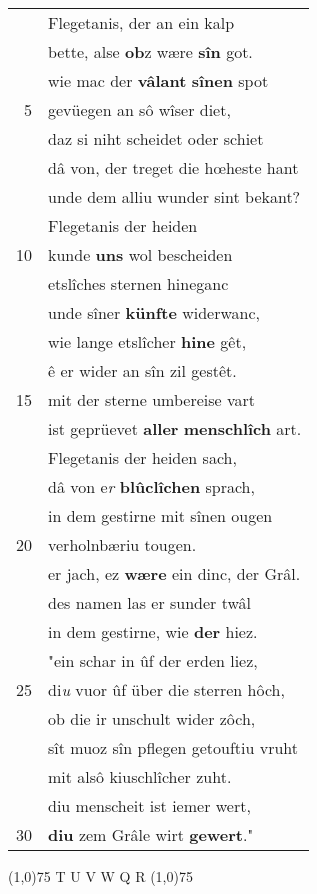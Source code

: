 \documentclass[8pt,a4paper,notitlepage]{article}
\begin{document}
\begin{table}[ht]
\begin{minipage}[t]{0.5\linewidth}
\begin{tabular}{rl}
 & Flegetanis, der an ein kalp\\ 
 & bette, alse \textbf{ob}z wære \textbf{sîn} got.\\ 
 & wie mac der \textbf{vâlant} \textbf{sînen} spot\\ 
5 & gevüegen an sô wîser diet,\\ 
 & daz si niht scheidet oder schiet\\ 
 & dâ von, der treget die hœheste hant\\ 
 & unde dem alliu wunder sint bekant?\\ 
 & Flegetanis der heiden\\ 
10 & kunde \textbf{uns} wol bescheiden\\ 
 & etslîches sternen hineganc\\ 
 & unde sîner \textbf{künfte} widerwanc,\\ 
 & wie lange etslîcher \textbf{hine} gêt,\\ 
 & ê er wider an sîn zil gestêt.\\ 
15 & mit der sterne umbereise vart\\ 
 & ist geprüevet \textbf{aller} \textbf{menschlîch} art.\\ 
 & Flegetanis der heiden sach,\\ 
 & dâ von e\textit{r} \textbf{blûclîchen} sprach,\\ 
 & in dem gestirne mit sînen ougen\\ 
20 & verholnbæriu tougen.\\ 
 & er jach, ez \textbf{wære} ein dinc, der Grâl.\\ 
 & des namen las er sunder twâl\\ 
 & in dem gestirne, wie \textbf{der} hiez.\\ 
 & "ein schar in ûf der erden liez,\\ 
25 & di\textit{u} vuor ûf über die sterren hôch,\\ 
 & ob die ir unschult wider zôch,\\ 
 & sît muoz sîn pflegen getouftiu vruht\\ 
 & mit alsô kiuschlîcher zuht.\\ 
 & diu menscheit ist iemer wert,\\ 
30 & \textbf{diu} zem Grâle wirt \textbf{gewert}."\\ 
\end{tabular}
\scriptsize
\line(1,0){75} \newline
T U V W Q R \newline
\line(1,0){75} \newline

\end{minipage}
\end{table}
\end{document}
